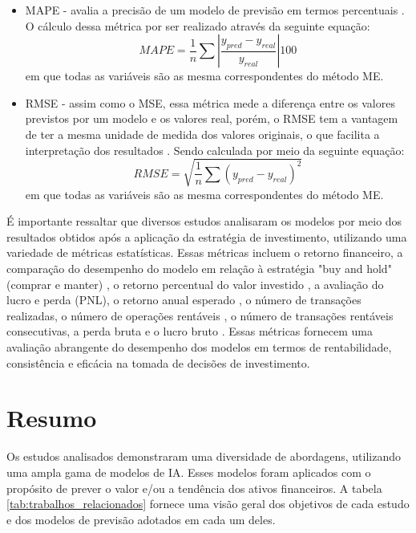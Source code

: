 \begin{itemize}
    \item \ac{MAPE} - avalia a precisão de um modelo de previsão em termos percentuais \cite{Anand_Comparison, Firat}. O cálculo dessa métrica por ser realizado através da seguinte equação:
    \begin{equation}
        \label{eq:MAPE}
        MAPE = \frac{1}{n} \sum \left | \frac{y_{pred} - y_{real}}{y_{real}} \right | 100
    \end{equation}
    em que todas as variáveis são as mesma correspondentes do método \ac{ME}.
    
    \item \ac{RMSE} - assim como o \ac{MSE}, essa métrica mede a diferença entre os valores previstos por um modelo e os valores real, porém, o \ac{RMSE} tem a vantagem de ter a mesma unidade de medida dos valores originais, o que facilita a interpretação dos resultados \cite{altan2019effect, pabucccu2023forecasting}. Sendo calculada por meio da seguinte equação: 
    \begin{equation}
        \label{eq:RMSE}
        RMSE = \sqrt{\frac{1}{n} \sum(y_{pred} - y_{real})^2}
    \end{equation}
    em que todas as variáveis são as mesma correspondentes do método \ac{ME}.
\end{itemize}

É importante ressaltar que diversos estudos analisaram os modelos por meio dos resultados obtidos após a aplicação da estratégia de investimento, utilizando uma variedade de métricas estatísticas. Essas métricas incluem o retorno financeiro, a comparação do desempenho do modelo em relação à estratégia "buy and hold" (comprar e manter) \cite{Ciniro_Econometric}, o retorno percentual do valor investido \cite{Chaojie_Stock}, a avaliação do lucro e perda (PNL), o retorno anual esperado \cite{Charlene}, o número de transações realizadas, o número de operações rentáveis \cite{C_Veeramani_Exploration}, o número de transações rentáveis consecutivas, a perda bruta e o lucro bruto \cite{Jerzy_Deep}. Essas métricas fornecem uma avaliação abrangente do desempenho dos modelos em termos de rentabilidade, consistência e eficácia na tomada de decisões de investimento.

\section{Resumo}
\label{subsec:resumo}
Os estudos analisados demonstraram uma diversidade de abordagens, utilizando uma ampla gama de modelos de \ac{IA}. Esses modelos foram aplicados com o propósito de prever o valor e/ou a tendência dos ativos financeiros. A tabela \ref{tab:trabalhos_relacionados} fornece uma visão geral dos objetivos de cada estudo e dos modelos de previsão adotados em cada um deles.

